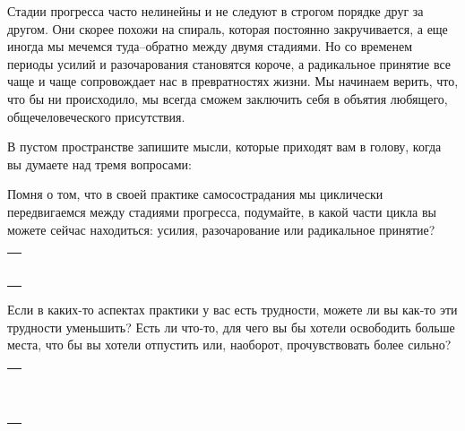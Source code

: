 Стадии прогресса часто нелинейны и не следуют в строгом порядке друг за другом. Они скорее похожи на спираль, которая постоянно закручивается, а еще иногда мы мечемся туда--обратно между двумя стадиями. Но со временем периоды усилий и разочарования становятся короче, а радикальное принятие все чаще и чаще сопровождает нас в превратностях жизни. Мы начинаем верить, что, что бы ни происходило, мы всегда сможем заключить себя в объятия любящего, общечеловеческого присутствия.

\newpage
{} \label{Ex:Where_Am_I_in_My_Self-Compassion_Practice}

В пустом пространстве запишите мысли, которые приходят вам в голову, когда вы думаете над тремя вопросами:

\begin{itemize}
	\itemWritingHand Помня о том, что в своей практике самосострадания мы циклически передвигаемся между стадиями прогресса, подумайте, в какой части цикла вы можете сейчас находиться: усилия, разочарование или радикальное принятие? 
\end{itemize}

\setlength{\extrarowheight}{2mm}
\begin{tabularx}{0.96\textwidth}{X}
	\\
	\arrayrulecolor{gray}\hline\\
	\hline\\
	\hline\\
	\hline\\
	\hline\\
	\hline\\
	\hline\\
\end{tabularx}

\setlength{\extrarowheight}{0mm}
\begin{itemize}
	\itemWritingHand Если в каких-то аспектах практики у вас есть трудности, можете ли вы как-то эти трудности уменьшить? Есть ли что-то, для чего вы бы хотели освободить больше места, что бы вы хотели отпустить или, наоборот, прочувствовать более сильно?
\end{itemize}

\setlength{\extrarowheight}{2mm}
\begin{tabularx}{0.96\textwidth}{X}
	\\
	\arrayrulecolor{gray}\hline\\
	\hline\\
	\hline\\
	\hline\\
	\hline\\
	\hline\\	
	\hline\\
	\hline\\
	\hline\\	
	\hline\\
	\hline\\
\end{tabularx}
\setlength{\extrarowheight}{0mm}

